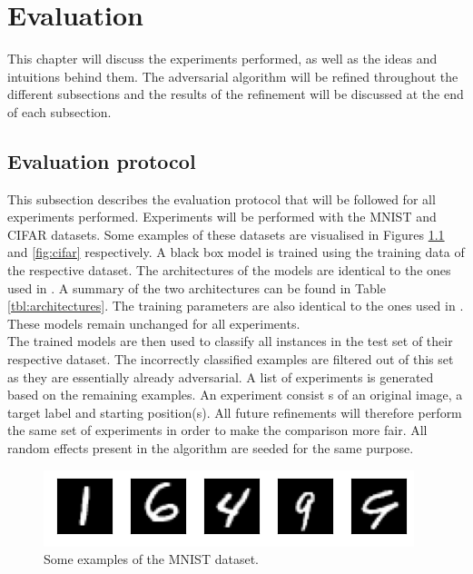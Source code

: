 \chapter{Evaluation}
This chapter will discuss the experiments performed, as well as the ideas and intuitions behind them. The adversarial algorithm will be refined throughout the different subsections and the results of the refinement will be discussed at the end of each subsection.

\section{Evaluation protocol}
This subsection describes the evaluation protocol that will be followed for all experiments performed. Experiments will be performed with the MNIST \cite{mnist} and CIFAR \cite{cifar} datasets. Some examples of these datasets are visualised in Figures \ref{fig:mnist} and \ref{fig:cifar} respectively. A black box model is trained using the training data of the respective dataset. The architectures of the models are identical to the ones used in \cite{cw_attack, defensive_distillation}. A summary of the two architectures can be found in Table \ref{tbl:architectures}. The training parameters are also identical to the ones used in \cite{cw_attack, defensive_distillation}. These models remain unchanged for all experiments.\\

The trained models are then used to classify all instances in the test set of their respective dataset. The incorrectly classified examples are filtered out of this set as they are essentially already adversarial. A list of experiments is generated based on the remaining examples. An experiment consist s of an original image, a target label and starting position(s). All future refinements will therefore perform the same set of experiments in order to make the comparison more fair. All random effects present in the algorithm are seeded for the same purpose.\\

\begin{figure}
\centering
\includegraphics[width=\textwidth]{Images/mnist.png}
\caption[Some examples of the MNIST dataset]{Some examples of the MNIST \cite{mnist} dataset.}
\label{fig:mnist}
\end{figure}


